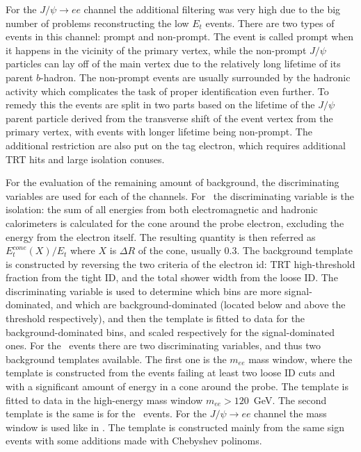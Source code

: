 For the $J/\psi \to ee$ channel the additional filtering was very high due to the big number of problems reconstructing the low $E_{t}$ events. There are two types of events in this channel: prompt and non-prompt. The event is called prompt when it happens in the vicinity of the primary vertex, while the non-prompt $J/\psi$ particles can lay off of the main vertex due to the relatively long lifetime of its parent $b$-hadron. The non-prompt events are usually surrounded by the hadronic activity which complicates the task of proper identification even further. To remedy this the events are split in two parts based on the lifetime of the $J/\psi$ parent particle derived from the transverse shift of the event vertex from the primary vertex, with events with longer lifetime being non-prompt. The additional restriction are also put on the tag electron, which requires additional TRT hits and large isolation conuses.

For the evaluation of the remaining amount of background, the discriminating variables are used for each of the channels. For \Wenu\ the discriminating variable is the isolation: the sum of all energies from both electromagnetic and hadronic calorimeters is calculated for the cone around the probe electron, excluding the energy from the electron itself. The resulting quantity is then referred as $E_{t}^{cone}(X)/E_{t}$ where $X$ is $\Delta R$ of the cone, usually $0.3$. The background template is constructed by reversing the two criteria of the electron id: TRT high-threshold fraction from the tight ID, and the total shower width from the loose ID. The discriminating variable is used to determine which bins are more signal-dominated, and which are background-dominated (located below and above the threshold respectively), and then the template is fitted to data for the background-dominated bins, and scaled respectively for the signal-dominated ones. For the \Zee\ events there are two discriminating variables, and thus two background templates available. The first one is the $m_{ee}$ mass window, where the template is constructed from the events failing at least two loose ID cuts and with a significant amount of energy in a cone around the probe. The template is fitted to data in the high-energy mass window $m_{ee} > 120$~GeV. The second template is the same is for the \Wenu\ events. For the $J/\psi \to ee$ channel the mass window is used like in \Zee. The template is constructed mainly from the same sign events with some additions made with Chebyshev polinoms.

